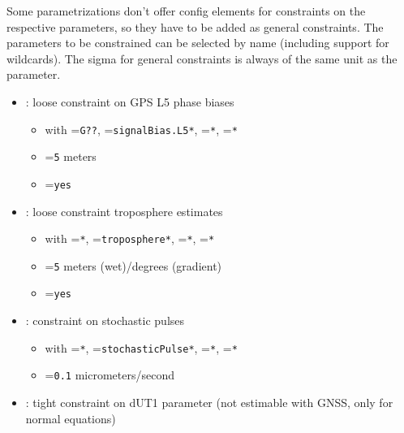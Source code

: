 Some parametrizations don't offer config elements for constraints on the respective parameters, so they have to be added
as general constraints. The parameters to be constrained can be selected by name (including support for wildcards).
The sigma for general constraints is always of the same unit as the parameter.
\begin{itemize}
  \item {}: loose constraint on GPS L5 phase biases
  \begin{itemize}
    \item {} with =\verb|G??|,
          =\verb|signalBias.L5*|, =\verb|*|, =\verb|*|
    \item {}=\verb|5| meters
    \item {}=\verb|yes|
  \end{itemize}
  \item {}: loose constraint troposphere estimates
  \begin{itemize}
    \item {} with =\verb|*|,
          =\verb|troposphere*|, =\verb|*|, =\verb|*|
    \item {}=\verb|5| meters (wet)/degrees (gradient)
    \item {}=\verb|yes|
  \end{itemize}
  \item {}: constraint on stochastic pulses
  \begin{itemize}
    \item {} with =\verb|*|,
          =\verb|stochasticPulse*|, =\verb|*|, =\verb|*|
    \item {}=\verb|0.1| micrometers/second
  \end{itemize}
  \item {}: tight constraint on dUT1 parameter
        (not estimable with GNSS, only for normal equations)
  \begin{itemize}

\end{itemize}
\end{itemize}
